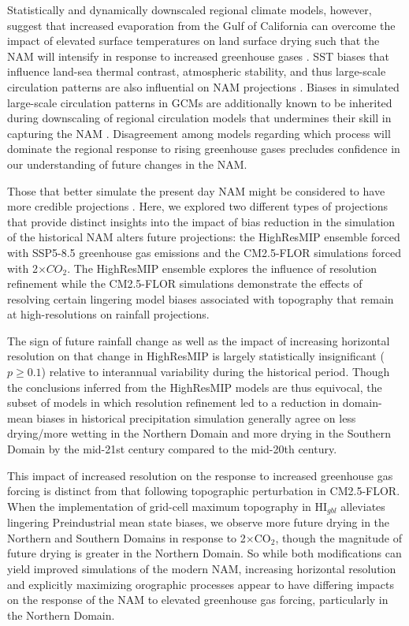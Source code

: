 \documentclass[draft]{agujournal2019}
\begin{document}
Statistically and dynamically downscaled regional climate models, however, suggest that increased evaporation from the Gulf of California can overcome the impact of elevated surface temperatures on land surface drying such that the NAM will intensify in response to increased greenhouse gases \cite{meyer17cd,wallace24cd,nazarian24jc,kim24ijc}. SST biases that influence land-sea thermal contrast, atmospheric stability, and thus large-scale circulation patterns are also influential on NAM projections \cite{higgins00jc,turrent09grl,bukovsky15jc,ye23jc}. Biases in simulated large-scale circulation patterns in GCMs are additionally known to be inherited during downscaling of regional circulation models that undermines their skill in capturing the NAM \cite{castro12jc,cerezo-mota16ijc}. Disagreement among models regarding which process will dominate the regional response to rising greenhouse gases precludes confidence in our understanding of future changes in the NAM.

Those that better simulate the present day NAM might be considered to have more credible projections \cite{bukovsky15jc}. Here, we explored two different types of projections that provide distinct insights into the impact of bias reduction in the simulation of the historical NAM alters future projections: the HighResMIP ensemble forced with SSP5-8.5 greenhouse gas emissions and the CM2.5-FLOR simulations forced with 2$\times CO_{2}$. The HighResMIP ensemble explores the influence of resolution refinement while the CM2.5-FLOR simulations demonstrate the effects of resolving certain lingering model biases associated with topography that remain at high-resolutions on rainfall projections.

The sign of future rainfall change as well as the impact of increasing horizontal resolution on that change in HighResMIP is largely statistically insignificant ($p\geq0.1$) relative to interannual variability during the historical period. Though the conclusions inferred from the HighResMIP models are thus equivocal, the subset of models in which resolution refinement led to a reduction in domain-mean biases in historical precipitation simulation generally agree on less drying/more wetting in the Northern Domain and more drying in the Southern Domain by the mid-21st century compared to the mid-20th century. 

This impact of increased resolution on the response to increased greenhouse gas forcing is distinct from that following topographic perturbation in CM2.5-FLOR. When the implementation of grid-cell maximum topography in HI$_{gbl}$ alleviates lingering Preindustrial mean state biases, we observe more future drying in the Northern and Southern Domains in response to 2$\times$CO$_2$, though the magnitude of future drying is greater in the Northern Domain. So while both modifications can yield improved simulations of the modern NAM, increasing horizontal resolution and explicitly maximizing orographic processes appear to have differing impacts on the response of the NAM to elevated greenhouse gas forcing, particularly in the Northern Domain. 
\end{document}
